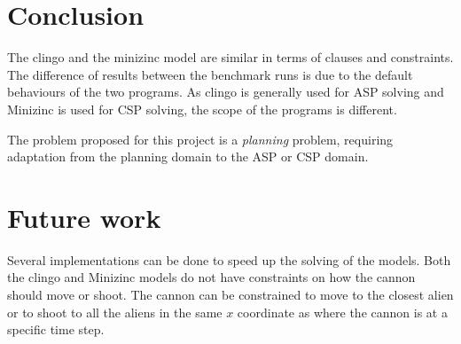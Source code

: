 \documentclass[11pt]{article}
\begin{document}
\section{Conclusion}
The clingo and the minizinc model are similar in terms of clauses and constraints.
The difference of results between the benchmark runs is due to the default behaviours of the two programs.
As clingo is generally used for ASP solving and Minizinc is used for CSP solving, the scope of the programs is different.

The problem proposed for this project is a \textit{planning} problem, requiring adaptation from the planning domain to the ASP or CSP domain.

\section{Future work}
Several implementations can be done to speed up the solving of the models.
Both the clingo and Minizinc models do not have constraints on how the cannon should move or shoot.
The cannon can be constrained to move to the closest alien or to shoot to all the aliens in the same $x$ coordinate as where the cannon is at a specific time step.


\printbibliography
\end{document}
